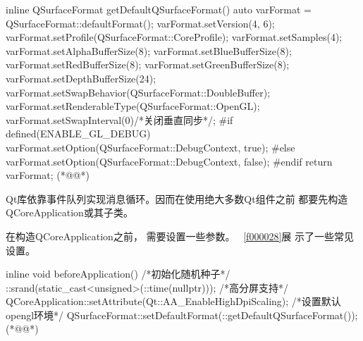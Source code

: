 \label{f000027}    %
\FloatBarrier                                  %
\begin{thebookfilesourceone}[escapeinside={(*@}{@*)},
caption=GoodLuck,
title=\filesourcenumbernameone \thefilesourcenumber
,firstnumber=18]
inline QSurfaceFormat getDefaultQSurfaceFormat() {
    auto varFormat = QSurfaceFormat::defaultFormat();
    varFormat.setVersion(4, 6);
    varFormat.setProfile(QSurfaceFormat::CoreProfile);
    varFormat.setSamples(4);
    varFormat.setAlphaBufferSize(8);
    varFormat.setBlueBufferSize(8);
    varFormat.setRedBufferSize(8);
    varFormat.setGreenBufferSize(8);
    varFormat.setDepthBufferSize(24);
    varFormat.setSwapBehavior(QSurfaceFormat::DoubleBuffer);
    varFormat.setRenderableType(QSurfaceFormat::OpenGL);
    varFormat.setSwapInterval(0)/*关闭垂直同步*/;
#if defined(ENABLE_GL_DEBUG)
    varFormat.setOption(QSurfaceFormat::DebugContext, true);
#else
    varFormat.setOption(QSurfaceFormat::DebugContext, false);
#endif
    return varFormat;
}(*@\marginpar[\hfill\setlength\fboxsep{2pt}\fbox{\footnotesize{\kaishu\parbox{1em}{\setlength{\baselineskip}{2pt}\filesourcenumbernameone}}\footnotesize{\thefilesourcenumber}}]{\setlength\fboxsep{2pt}\fbox{\footnotesize{\kaishu\parbox{1em}{\setlength{\baselineskip}{2pt}\filesourcenumbernameone}}\footnotesize{\thefilesourcenumber}}}@*)\end{thebookfilesourceone}          %
\addtocounter{lstlisting}{-1}   %

Qt库依靠事件队列实现消息循环。因而在使用绝大多数Qt组件之前
都要先构造QCoreApplication或其子类。

在构造QCoreApplication之前，
需要设置一些参数。
\filesourcenumbernameone\ \ref{f000028}展
示了一些常见设置。

\label{f000028}    %
\FloatBarrier                                  %
\begin{thebookfilesourceone}[escapeinside={(*@}{@*)},
caption=GoodLuck,
title=\filesourcenumbernameone \thefilesourcenumber
,firstnumber=39]
inline void beforeApplication() {
    {
        /*初始化随机种子*/
        ::srand(static_cast<unsigned>(::time(nullptr)));
    }
    {
        /*高分屏支持*/
        QCoreApplication::setAttribute(Qt::AA_EnableHighDpiScaling);
    }
    {
        /*设置默认opengl环境*/
        QSurfaceFormat::setDefaultFormat(::getDefaultQSurfaceFormat());
    }
}(*@\marginpar[\hfill\setlength\fboxsep{2pt}\fbox{\footnotesize{\kaishu\parbox{1em}{\setlength{\baselineskip}{2pt}\filesourcenumbernameone}}\footnotesize{\thefilesourcenumber}}]{\setlength\fboxsep{2pt}\fbox{\footnotesize{\kaishu\parbox{1em}{\setlength{\baselineskip}{2pt}\filesourcenumbernameone}}\footnotesize{\thefilesourcenumber}}}@*)\end{thebookfilesourceone}          %
\addtocounter{lstlisting}{-1}   %

